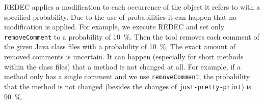 \documentclass[%
class=scrreprt,
chapterprefix=false,%
open=right,%
twoside=true,%
paper=a4,%
logofile={Logo\_zentral\_farbig\_EN.png},%
thesistype=master,%
UKenglish,%
]{se2thesis}
\theoremstyle{definition}
\newcommand{\rdh}{REDEC\xspace}
\newcommand{\none}{just-pretty-print\xspace} %
\newcommand{\nonet}{\texttt{\none}\xspace} %
\begin{document}
	\rdh applies a modification to each occurrence of the object it refers to with a specified probability. Due to the use of probabilities it can happen that no modification is applied. For example, we execute \rdh and set only \texttt{removeComment} to a probability of 10~\%. Then the tool removes each comment of the given Java class files with a probability of 10~\%. The exact amount of removed comments is uncertain. It can happen (especially for short methods within the class files) that a method is not changed at all. For example, if a method only has a single comment and we use \texttt{removeComment}, the probability that the method is not changed (besides the changes of \nonet) is 90~\%.

	
	
\end{document}
